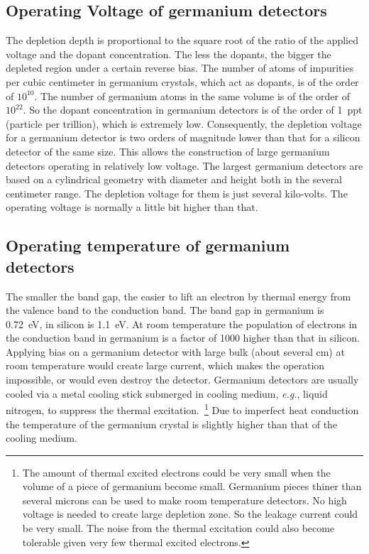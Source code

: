 \subsection{Operating Voltage of germanium detectors}
\label{sec:det:temp}
The depletion depth is proportional to the square root of the ratio of the applied voltage and the dopant concentration. The less the dopants, the bigger the depleted region under a certain reverse bias. The number of atoms of impurities per cubic centimeter in germanium crystals, which act as dopants, is of the order of $10^{10}$. The number of germanium atoms in the same volume is of the order of $10^{22}$. So the dopant concentration in germanium detectors is of the order of 1~ppt (particle per trillion), which is extremely low. Consequently, the depletion voltage for a germanium detector is two orders of magnitude lower than that for a silicon detector of the same size. This allows the construction of large germanium detectors operating in relatively low voltage. The largest germanium detectors are based on a cylindrical geometry with diameter and height both in the several centimeter range. The depletion voltage for them is just several kilo-volts. The operating voltage is normally a little bit higher than that.

\subsection{Operating temperature of germanium detectors}
\label{sec:det:temp}
The smaller the band gap, the easier to lift an electron by thermal energy from the valence band to the conduction band. The band gap in germanium is 0.72~eV, in silicon is 1.1~eV. At room temperature the population of electrons in the conduction band in germanium is a factor of 1000 higher than that in silicon. Applying bias on a germanium detector with large bulk (about several cm) at room temperature would create large current, which makes the operation impossible, or would even destroy the detector. Germanium detectors are usually cooled via a metal cooling stick submerged in cooling medium, \textit{e.g.}, liquid nitrogen, to suppress the thermal excitation.~\footnote{The amount of thermal excited electrons could be   very small when the volume of a piece of germanium become small.   Germanium pieces thiner than several microns can be used to make   room temperature detectors. No high voltage is needed to create   large depletion zone. So the leakage current could be very   small. The noise from the thermal excitation could also become   tolerable given very few thermal excited electrons.} Due to imperfect heat conduction the temperature of the germanium crystal is slightly higher than that of the cooling medium.



